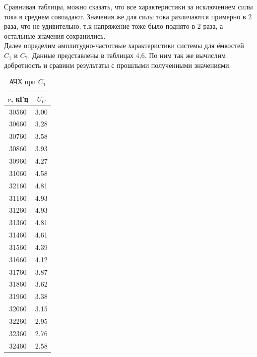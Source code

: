 \indent Сравнивая таблицы, можно сказать, что все характеристики за исключением силы тока в среднем совпадают. Значения же для силы тока различаются примерно в 2 раза, что не удивительно, т.к напряжение тоже было поднято в 2 раза, а остальные значения сохранились.
\\\indent Далее определим амплитудно-частотные характеристики системы для ёмкостей $C_1$ и $C_7$. Данные представлены в таблицах 4,6. По ним так же вычислим добротность и сравинм результаты с прошлыми полученными значениями.
\newpage
\begin{table}[h!]
    \begin{minipage}{0.3\linewidth}
        \begin{tabular}{|c|c|}
            \hline
            $\nu$, кГц  & $U_C$\\\hline
            30560 &  3.00 \\\hline
            30660 &  3.28 \\\hline
            30760 &  3.58 \\\hline
            30860 &  3.93 \\\hline
            30960 &  4.27 \\\hline
            31060 &  4.58 \\\hline
            32160 &  4.81 \\\hline
            31160 &  4.93 \\\hline
            31260 &  4.93 \\\hline
            31360 &  4.81 \\\hline
            31460 &  4.61 \\\hline
            31560 &  4.39 \\\hline
            31660 &  4.12 \\\hline
            31760 &  3.87 \\\hline
            31860 &  3.62 \\\hline
            31960 &  3.38 \\\hline
            32060 &  3.15 \\\hline
            32260 &  2.95 \\\hline
            32360 &  2.76 \\\hline
            32460 &  2.58 \\\hline
        \end{tabular}
        \caption{АЧХ при $C_1$}
    \end{minipage}
    \begin{minipage}{0.7\textwidth}
        \centering

\end{minipage}
\end{table}
